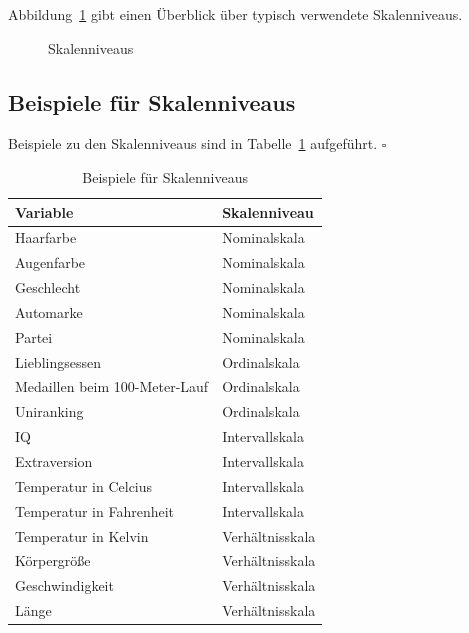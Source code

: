 \documentclass[
  a4paper,
  DIV=11]{scrreprt}
\theoremstyle{definition}
\theoremstyle{definition}
\theoremstyle{definition}
\theoremstyle{remark}
\begin{document}
Abbildung~\ref{fig-skalenniveau} gibt einen Überblick über typisch
verwendete Skalenniveaus.

\begin{figure}


\caption{\label{fig-skalenniveau}Skalenniveaus}

\end{figure}%

\subsection{Beispiele für
Skalenniveaus}\label{beispiele-fuxfcr-skalenniveaus}

Beispiele zu den Skalenniveaus sind in Tabelle~\ref{tbl-skalen-bsps}
aufgeführt. \(\square\)

\begin{longtable}[]{@{}ll@{}}

\caption{\label{tbl-skalen-bsps}Beispiele für Skalenniveaus}

\tabularnewline

\toprule\noalign{}
Variable & Skalenniveau \\
\midrule\noalign{}
\endhead
\bottomrule\noalign{}
\endlastfoot
Haarfarbe & Nominalskala \\
Augenfarbe & Nominalskala \\
Geschlecht & Nominalskala \\
Automarke & Nominalskala \\
Partei & Nominalskala \\
Lieblingsessen & Ordinalskala \\
Medaillen beim 100-Meter-Lauf & Ordinalskala \\
Uniranking & Ordinalskala \\
IQ & Intervallskala \\
Extraversion & Intervallskala \\
Temperatur in Celcius & Intervallskala \\
Temperatur in Fahrenheit & Intervallskala \\
Temperatur in Kelvin & Verhältnisskala \\
Körpergröße & Verhältnisskala \\
Geschwindigkeit & Verhältnisskala \\
Länge & Verhältnisskala \\

\end{longtable}
\end{document}
